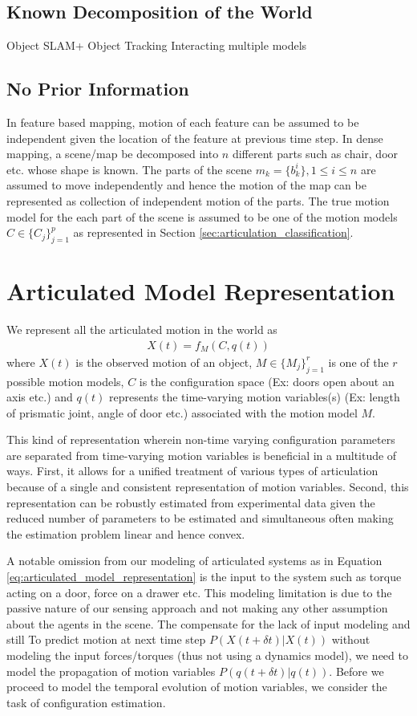 \documentclass[conference]{IEEEtran}
\begin{document}
\subsection{Known Decomposition of the World} Object SLAM+ Object Tracking Interacting multiple models


\subsection{No Prior Information}
In feature based mapping, motion of each feature can be assumed to be independent given the location of the feature at previous time step. In dense mapping, a scene/map be decomposed into $n$ different parts such as chair, door etc. whose shape is known. The parts of the scene $m_k = \{b^i_k\},  1\leq i \leq n$ are assumed to move independently and hence the motion of the map can be represented as collection of independent motion of the parts. The true motion model for the  each part of the scene is assumed to be one of the motion models $C \in \{C_j\}^{p}_{j=1}$ as represented in Section \ref{sec:articulation_classification}. 


\section{Articulated Model Representation} We represent all the articulated motion in the world as 
\begin{align}
X(t) = f_M(C,q(t)) \label{eq:articulated_model_representation}
\end{align}
where $X(t)$ is the observed motion of an object, $M \in \{M_j\}_{j=1}^r$ is one of the $r$ possible motion models, $C$ is the configuration space (Ex: doors open about an axis etc.) and $q(t)$ represents the time-varying motion variables(s) (Ex: length of prismatic joint, angle of door etc.) associated with the motion model $M$.  

This kind of representation wherein non-time varying configuration parameters are separated from time-varying motion variables is beneficial in a multitude of ways. First, it allows for a unified treatment of various types of articulation because of a single and consistent representation of motion variables. Second, this representation can be robustly estimated from experimental data given the reduced number of parameters to be estimated and simultaneous often making the estimation problem linear and hence convex.

A notable omission from our modeling of articulated systems as in Equation \ref{eq:articulated_model_representation} is the input to the system such as torque acting on a door, force on a drawer etc. This modeling limitation is due to the passive nature of our sensing approach and not making any other assumption about the agents in the scene. The compensate for the lack of input modeling and still To predict motion at next time step $P(X(t+\delta t)|X(t))$ without modeling the input forces/torques (thus not using a dynamics model), we need to model the propagation of motion variables $P(q(t+\delta t)|q(t))$. Before we proceed to model the temporal evolution of motion variables, we consider the task of configuration estimation.
\end{document}
